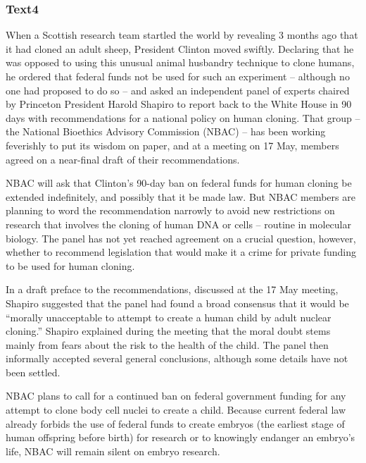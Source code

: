 \documentclass[a4paper]{article}
\begin{document}
\subsubsection{Text4}

\par
When a Scottish research team startled the world by revealing 3 months ago that it had cloned an adult sheep, President Clinton moved swiftly. Declaring that he was opposed to using this unusual animal husbandry technique to clone humans, he ordered that federal funds not be used for such an experiment -- although no one had proposed to do so -- and asked an independent panel of experts chaired by Princeton President Harold Shapiro to report back to the White House in 90 days with recommendations for a national policy on human cloning. That group -- the National Bioethics Advisory Commission (NBAC) -- has been working feverishly to put its wisdom on paper, and at a meeting on 17 May, members agreed on a near-final draft of their recommendations.

\par
NBAC will ask that Clinton’s 90-day ban on federal funds for human cloning be extended indefinitely, and possibly that it be made law. But NBAC members are planning to word the recommendation narrowly to avoid new restrictions on research that involves the cloning of human DNA or cells -- routine in molecular biology. The panel has not yet reached agreement on a crucial question, however, whether to recommend legislation that would make it a crime for private funding to be used for human cloning.

\par
In a draft preface to the recommendations, discussed at the 17 May meeting, Shapiro suggested that the panel had found a broad consensus that it would be “morally unacceptable to attempt to create a human child by adult nuclear cloning.” Shapiro explained during the meeting that the moral doubt stems mainly from fears about the risk to the health of the child. The panel then informally accepted several general conclusions, although some details have not been settled.

\par
NBAC plans to call for a continued ban on federal government funding for any attempt to clone body cell nuclei to create a child. Because current federal law already forbids the use of federal funds to create embryos (the earliest stage of human offspring before birth) for research or to knowingly endanger an embryo’s life, NBAC will remain silent on embryo research.
\end{document}
